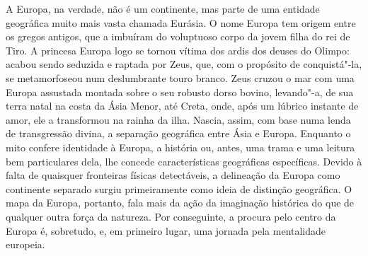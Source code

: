 
A Europa, na verdade, não é um continente, mas parte de uma entidade
geográfica muito mais vasta chamada Eurásia. O nome Europa tem origem
entre os gregos antigos, que a imbuíram do voluptuoso corpo da jovem
filha do rei de Tiro. A princesa Europa logo se tornou vítima dos ardis
dos deuses do Olimpo: acabou sendo seduzida e raptada por Zeus, que, com
o propósito de conquistá"-la, se metamorfoseou num deslumbrante touro
branco. Zeus cruzou o mar com uma Europa assustada montada sobre o seu
robusto dorso bovino, levando"-a, de sua terra natal na costa da Ásia
Menor, até Creta, onde, após um lúbrico instante de amor, ele a
transformou na rainha da ilha. Nascia, assim, com base numa lenda de
transgressão divina, a separação geográfica entre Ásia e Europa.
Enquanto o mito confere identidade à Europa, a história ou, antes, uma
trama e uma leitura bem particulares dela, lhe concede características
geográficas específicas. Devido à falta de quaisquer fronteiras físicas
detectáveis, a delineação da Europa como continente separado surgiu
primeiramente como ideia de distinção geográfica. O mapa da Europa,
portanto, fala mais da ação da imaginação histórica do que de qualquer
outra força da natureza. Por conseguinte, a procura pelo centro da
Europa é, sobretudo, e, em primeiro lugar, uma jornada pela mentalidade
europeia.

